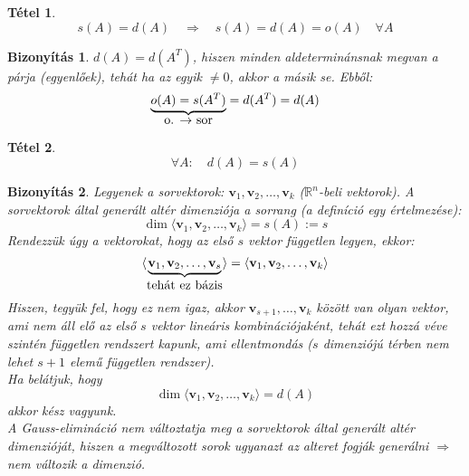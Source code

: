 \documentclass[a4paper,12pt,twoside]{book}
\newcommand{\vek}[1]{\mathbf{#1}} %
\newcommand{\lista}[2]{{#1}_{1}, {#1}_{2}, \ldots, {#1}_{#2}}
\newcommand{\gen}[1]{\langle #1 \rangle}
\newcommand{\R}{\mathbb{R}}
\newtheorem{tetel}{Tétel}[chapter]
\newtheorem{biz}{Bizonyítás}[chapter]
\theoremstyle{break}
\begin{document}
\begin{tetel}
 \[\boxed{ s(A)=d(A) \quad \Rightarrow \quad s(A)=d(A)=o(A) \quad \forall A }\]
\end{tetel}
\begin{biz}
 $d(A) = d(A^T)$, hiszen minden aldeterminánsnak megvan a párja (egyenlőek), tehát ha az egyik $\neq 0$, akkor a másik se. Ebből:
\[\underbrace{o(A) = s(A^T)}_{\hbox{o. $\rightarrow$ sor}} = d(A^T) = d(A)\]
\end{biz}

\begin{tetel}
 \[\boxed{\forall A: \quad d(A) = s(A)}\]
\end{tetel}
\begin{biz}
 Legyenek a sorvektorok: $\lista{\vek{v}}{k}$ ($\R^n$-beli vektorok). A sorvektorok által generált altér dimenziója a sorrang (a definíció egy értelmezése): 
\[\dim\gen{ \lista{\vek{v}}{k} } = s(A) := s\]
Rendezzük úgy a vektorokat, hogy az első $s$ vektor független legyen, ekkor:
\[\gen{  \underbrace{ \lista{\vek{v}}{s} }_{\hbox{tehát ez bázis}} } = \gen{ \lista{\vek{v}}{k} }\]
Hiszen, tegyük fel, hogy ez nem igaz, akkor $\vek{v}_{s+1}, \ldots, \vek{v}_k$ között van olyan vektor, ami nem áll elő az első $s$ vektor lineáris kombinációjaként, tehát ezt hozzá véve szintén független rendszert kapunk, ami ellentmondás ($s$ dimenziójú térben nem lehet $s+1$ elemű független rendszer).\\

Ha belátjuk, hogy
\[\dim\gen{ \lista{\vek{v}}{k} } = d(A)\]
akkor kész vagyunk.\\

A Gauss-elimináció nem változtatja meg a sorvektorok által generált altér dimenzióját, hiszen a megváltozott sorok ugyanazt az alteret fogják generálni $\Rightarrow$ nem változik a dimenzió.\\


\end{biz}
\end{document}
